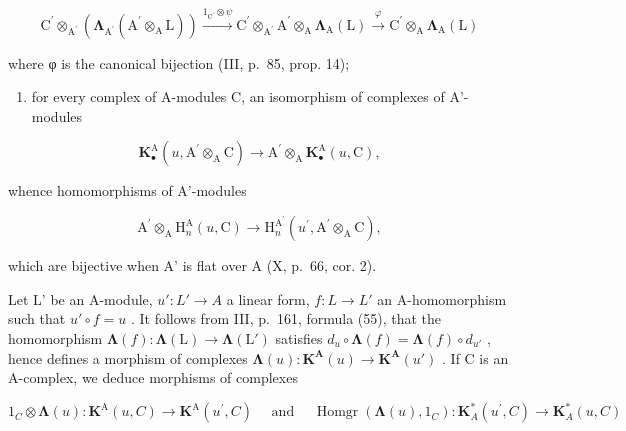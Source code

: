 \[
\mathrm{C} ^ {\prime} \otimes_ {\mathrm{A} ^ {\prime}} \left(\boldsymbol {\Lambda} _ {\mathrm{A} ^ {\prime}} \left(\mathrm{A} ^ {\prime} \otimes_ {\mathrm{A}} \mathrm{L}\right)\right) \xrightarrow {1 _ {\mathrm{C} ^ {\prime}} \otimes \psi} \mathrm{C} ^ {\prime} \otimes_ {\mathrm{A} ^ {\prime}} \mathrm{A} ^ {\prime} \otimes_ {\mathrm{A}} \boldsymbol {\Lambda} _ {\mathrm{A}} (\mathrm{L}) \xrightarrow {\varphi} \mathrm{C} ^ {\prime} \otimes_ {\mathrm{A}} \boldsymbol {\Lambda} _ {\mathrm{A}} (\mathrm{L})
\]

where φ is the canonical bijection (III, p.~85, prop. 14);

\begin{enumerate}
\def\labelenumi{\arabic{enumi})}
\setcounter{enumi}{1}
\tightlist
\item
  for every complex of A-modules C, an isomorphism of complexes of A'-modules
\end{enumerate}

\[
\mathbf {K} _ {\bullet} ^ {\mathrm{A}} (u, \mathrm{A} ^ {\prime} \otimes_ {\mathrm{A}} \mathrm{C}) \rightarrow \mathrm{A} ^ {\prime} \otimes_ {\mathrm{A}} \mathbf {K} _ {\bullet} ^ {\mathrm{A}} (u, \mathrm{C}),
\]

whence homomorphisms of A'-modules

\[
\mathrm{A} ^ {\prime} \otimes_ {\mathrm{A}} \mathrm{H} _ {n} ^ {\mathrm{A}} (u, \mathrm{C}) \rightarrow \mathrm{H} _ {n} ^ {\mathrm{A} ^ {\prime}} (u ^ {\prime}, \mathrm{A} ^ {\prime} \otimes_ {\mathrm{A}} \mathrm{C}),
\]

which are bijective when A' is flat over A (X, p.~66, cor. 2).

Let L' be an A-module, \(u': L' \to A\) a linear form, \(f: L \to L'\) an A-homomorphism such that \(u' \circ f = u\) . It follows from III, p.~161, formula (55), that the homomorphism \(\symbf{\Lambda}(f): \symbf{\Lambda}(\mathrm{L}) \to \symbf{\Lambda}(\mathrm{L}')\) satisfies \(d_u \circ \symbf{\Lambda}(f) = \symbf{\Lambda}(f) \circ d_{u'}\) , hence defines a morphism of complexes \(\symbf{\Lambda}(u): \mathbf{K}^{\mathbf{A}}(u) \to \mathbf{K}^{\mathbf{A}}(u')\) . If C is an A-complex, we deduce morphisms of complexes

\[
1 _ {C} \otimes \boldsymbol {\Lambda} (u): \mathbf {K} ^ {\mathrm{A}} (u, C) \rightarrow \mathbf {K} ^ {\mathrm{A}} \left(u ^ {\prime}, C\right) \quad \text { and }\quad \operatorname{Homgr} \left(\boldsymbol {\Lambda} (u), 1 _ {C}\right): \mathbf {K} _ {A} ^ {*} \left(u ^ {\prime}, C\right)\rightarrow \mathbf {K} _ {A} ^ {*} (u, C)
\]

